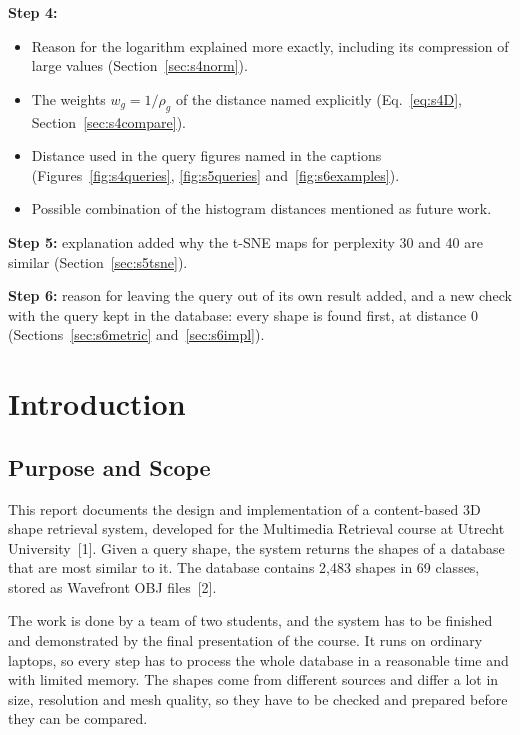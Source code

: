 \documentclass[10pt,a4paper]{article}
\begin{document}
\textbf{Step 4:}
\begin{itemize}
  \item Reason for the logarithm explained more exactly, including its compression of large values (Section~\ref{sec:s4norm}).
  \item The weights $w_g=1/\rho_g$ of the distance named explicitly (Eq.~\eqref{eq:s4D}, Section~\ref{sec:s4compare}).
  \item Distance used in the query figures named in the captions (Figures~\ref{fig:s4queries}, \ref{fig:s5queries} and~\ref{fig:s6examples}).
  \item Possible combination of the histogram distances mentioned as future work.
\end{itemize}

\textbf{Step 5:} explanation added why the t-SNE maps for perplexity 30 and 40 are similar (Section~\ref{sec:s5tsne}).

\textbf{Step 6:} reason for leaving the query out of its own result added, and a new check with the query kept in the
database: every shape is found first, at distance 0 (Sections~\ref{sec:s6metric} and~\ref{sec:s6impl}).

\clearpage

{\small\tableofcontents}
\clearpage

\section{Introduction}\label{sec:intro}

\subsection{Purpose and Scope}
This report documents the design and implementation of a content-based 3D shape retrieval system, developed for the Multimedia
Retrieval course at Utrecht University~[1]. Given a query shape, the system returns the shapes of a database that are most
similar to it. The database contains 2,483 shapes in 69 classes, stored as Wavefront OBJ files~[2].

The work is done by a team of two students, and the system has to be finished and demonstrated by the final presentation of
the course. It runs on ordinary laptops, so every step has to process the whole database in a reasonable time and with limited
memory. The shapes come from different sources and differ a lot in size, resolution and mesh quality, so they have to be checked
and prepared before they can be compared.
\end{document}
